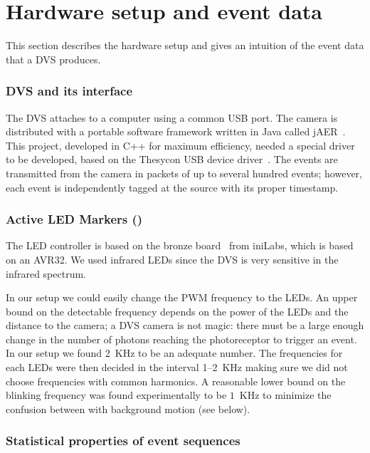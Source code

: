 
\section{Hardware setup and event data\label{sec:Hardware-setup-and}}

This section describes the hardware setup and gives an intuition of
the event data that a DVS produces.


\subsubsection{DVS and its interface\label{sec:interface}}

The DVS attaches to a computer using a common USB port. The camera
is distributed with a portable software framework written in Java
called jAER~\cite{jaer}. This project, developed in C++ for maximum
efficiency, needed a special driver to be developed, based on the
Thesycon USB device driver~\cite{thesycon}. The events are transmitted
from the camera in packets of up to several hundred events; however,
each event is independently tagged at the source with its proper timestamp.



\subsubsection{Active LED Markers (\ALMs)\label{sec:leds}}

The LED controller is based on the bronze board~\cite{bronzeboard}
from iniLabs, which is based on an AVR32.  We used infrared LEDs
since the DVS is very sensitive in the infrared spectrum. 



In our setup we could easily change the PWM frequency to the LEDs.
An upper bound on the detectable frequency depends on the power of
the LEDs and the distance to the camera; a DVS camera is not magic:
there must be a large enough change in the number of photons reaching
the photoreceptor to trigger an event. In our setup we found 2~KHz
to be an adequate number. The frequencies for each LEDs were then
decided in the interval 1--2~KHz making sure we did not choose frequencies
with common harmonics. A reasonable lower bound on the blinking frequency
was found experimentally to be $1$~KHz to minimize the confusion
between with background motion (see 
below).


\subsubsection{Statistical properties of event sequences}

